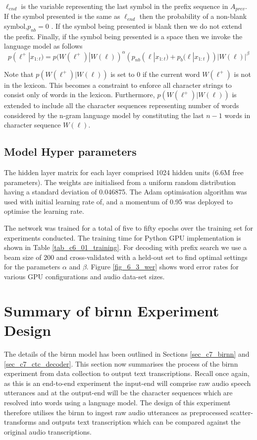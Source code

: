 {$\ell_{end}$ is the variable representing the last symbol in the prefix sequence in $A_{prev}$. If the symbol presented is the same as $\ell_{end}$ then the probability of a non-blank symbol,$p_{nb}=0$ . If the symbol being presented is blank then we do not extend the prefix.  Finally, if the symbol being presented is a space then we invoke the language model as follows
\begin{equation}
p(\ell^+|x_{1:t})=p(W(\ell^+)|W(\ell))^\alpha(p_{nb}(\ell|x_{1:t})+p_b(\ell|x_{1:t}))|W(\ell)|^\beta
\label{eqn_c6_decoder03}
\end{equation}

Note that $p(W(\ell^+)|W(\ell))$ is set to $0$ if the current word $W(\ell^+)$ is not in the lexicon. This becomes a constraint to enforce all character strings to consist only of words in the lexicon.  Furthermore,  $p(W(\ell^+)|W(\ell))$ is extended to include all the character sequences representing number of words considered by the n-gram language model by constituting the last $n-1$ words in character sequence $W(\ell)$.

\subsection{Model Hyper parameters}
The hidden layer matrix for each layer comprised 1024 hidden units (6.6M free parameters).  The weights are initialised from a uniform random distribution having a standard deviation of 0.046875.  The Adam optimisation algorithm \citep{kingma2014adam} was used with initial learning rate of, and a momentum of 0.95 was deployed to optimise the learning rate.

The network was trained for a total of five to fifty epochs over the training set for experiments conducted. The training time for Python GPU implementation is shown in Table \ref{tab_c6_01_training}.  For decoding with prefix search we use a beam size of $200$ and cross-validated with a held-out set to find optimal settings for the parameters $\alpha$ and $\beta$. Figure \ref{fig_6_3_wer} shows word error rates for various GPU configurations and audio data-set sizes.


\section{Summary of \acrshort{birnn} Experiment Design}
The details of the \acrshort{birnn} model has been outlined in Sections \ref{sec_c7_birnn} and \ref{sec_c7_ctc_decoder}.  This section now summarises the process of the \acrshort{birnn} experiment from data collection to output text transcriptions.  Recall once again, as this is an end-to-end experiment the input-end will comprise raw audio speech utterances and at the output-end will be the character sequences which are resolved into words using a language model. The design of this experiment therefore utilises the \acrshort{birnn} to ingest raw audio utterances as preprocessed scatter-transforms and outputs text transcription which can be compared against the original audio transcriptions.

}
